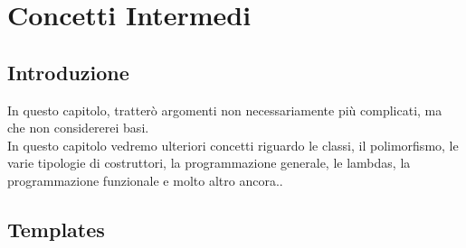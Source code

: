 
\chapter{Concetti Intermedi}












\section{Introduzione}

\textsf{\small In questo capitolo, tratterò argomenti non necessariamente più complicati, ma che non considererei basi. } \\

\textsf{\small In questo capitolo vedremo ulteriori concetti riguardo le classi, il polimorfismo, le varie tipologie di costruttori, la programmazione generale, le lambdas, la programmazione funzionale e molto altro ancora..} \break



\newpage

\section{Templates}

